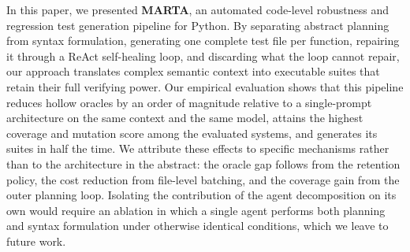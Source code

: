 In this paper, we presented \textbf{MARTA}, an automated code-level robustness and
regression test generation pipeline for Python. By separating abstract planning from
syntax formulation, generating one complete test file per function, repairing it
through a ReAct self-healing loop, and discarding what the loop cannot repair, our
approach translates complex semantic context into executable suites that retain their
full verifying power. Our empirical evaluation shows that this pipeline reduces hollow
oracles by an order of magnitude relative to a single-prompt architecture on the same
context and the same model, attains the highest coverage and mutation score among the
evaluated systems, and generates its suites in half the time. We attribute these
effects to specific mechanisms rather than to the architecture in the abstract: the
oracle gap follows from the retention policy, the cost reduction from file-level
batching, and the coverage gain from the outer planning loop. Isolating the
contribution of the agent decomposition on its own would require an ablation in which
a single agent performs both planning and syntax formulation under otherwise identical
conditions, which we leave to future work.
